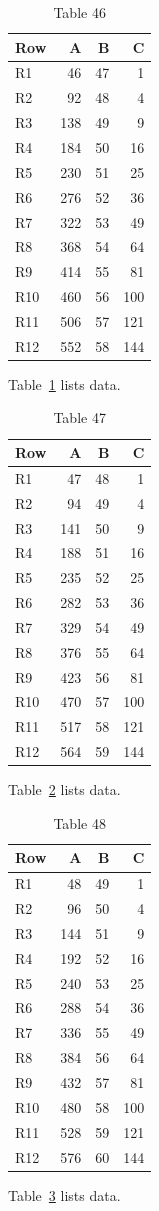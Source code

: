 \documentclass[10pt]{article}
\begin{document}
\begin{table}[ht]\centering\caption{Table 46}\label{tab:46}\begin{tabular}{lrrr}\toprule Row&A&B&C\\\midrule
R1&46&47&1\\
R2&92&48&4\\
R3&138&49&9\\
R4&184&50&16\\
R5&230&51&25\\
R6&276&52&36\\
R7&322&53&49\\
R8&368&54&64\\
R9&414&55&81\\
R10&460&56&100\\
R11&506&57&121\\
R12&552&58&144\\
\bottomrule\end{tabular}\end{table} Table~\ref{tab:46} lists data.
\begin{table}[ht]\centering\caption{Table 47}\label{tab:47}\begin{tabular}{lrrr}\toprule Row&A&B&C\\\midrule
R1&47&48&1\\
R2&94&49&4\\
R3&141&50&9\\
R4&188&51&16\\
R5&235&52&25\\
R6&282&53&36\\
R7&329&54&49\\
R8&376&55&64\\
R9&423&56&81\\
R10&470&57&100\\
R11&517&58&121\\
R12&564&59&144\\
\bottomrule\end{tabular}\end{table} Table~\ref{tab:47} lists data.
\begin{table}[ht]\centering\caption{Table 48}\label{tab:48}\begin{tabular}{lrrr}\toprule Row&A&B&C\\\midrule
R1&48&49&1\\
R2&96&50&4\\
R3&144&51&9\\
R4&192&52&16\\
R5&240&53&25\\
R6&288&54&36\\
R7&336&55&49\\
R8&384&56&64\\
R9&432&57&81\\
R10&480&58&100\\
R11&528&59&121\\
R12&576&60&144\\
\bottomrule\end{tabular}\end{table}\clearpage Table~\ref{tab:48} lists data.
\end{document}
